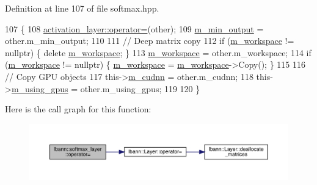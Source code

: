 Definition at line 107 of file softmax.\+hpp.


\begin{DoxyCode}
107                                                        \{
108     \hyperlink{classlbann_1_1Layer_a00d8acde68fda2f38c4a39ef8c89234a}{activation\_layer::operator=}(other);
109     \hyperlink{classlbann_1_1softmax__layer_ab3bf2d92f4441923dd0b792c38ec774a}{m\_min\_output} = other.m\_min\_output;
110 
111     \textcolor{comment}{// Deep matrix copy}
112     \textcolor{keywordflow}{if} (\hyperlink{classlbann_1_1softmax__layer_a604e614de25758f0072308c7efdd5bdb}{m\_workspace} != \textcolor{keyword}{nullptr}) \{ \textcolor{keyword}{delete} \hyperlink{classlbann_1_1softmax__layer_a604e614de25758f0072308c7efdd5bdb}{m\_workspace}; \}
113     \hyperlink{classlbann_1_1softmax__layer_a604e614de25758f0072308c7efdd5bdb}{m\_workspace} = other.m\_workspace;
114     \textcolor{keywordflow}{if} (\hyperlink{classlbann_1_1softmax__layer_a604e614de25758f0072308c7efdd5bdb}{m\_workspace} != \textcolor{keyword}{nullptr}) \{ \hyperlink{classlbann_1_1softmax__layer_a604e614de25758f0072308c7efdd5bdb}{m\_workspace} = 
      \hyperlink{classlbann_1_1softmax__layer_a604e614de25758f0072308c7efdd5bdb}{m\_workspace}->Copy(); \}
115 
116     \textcolor{comment}{// Copy GPU objects}
117     this->\hyperlink{classlbann_1_1Layer_a08dbb94239e3b8c96329786c57c72e21}{m\_cudnn} = other.m\_cudnn;
118     this->\hyperlink{classlbann_1_1Layer_af7881cb5eff5207c15fa835d65462e8f}{m\_using\_gpus} = other.m\_using\_gpus;
119 
120   \}
\end{DoxyCode}
Here is the call graph for this function\+:\nopagebreak
\begin{figure}[H]
\begin{center}
\leavevmode
\includegraphics[width=350pt]{classlbann_1_1softmax__layer_a8532a4e2b1669840cea80cfde383bebb_cgraph}
\end{center}
\end{figure}
\mbox{\label{classlbann_1_1softmax__layer_a4cc8f1f44a2854e78dad4f898d66a5ac}} 
